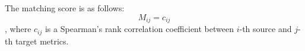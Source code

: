 The matching score is as follows:
\begin{equation}M_{ij}=c_{ij}\end{equation}
, where $c_{ij}$ is a Spearman's rank correlation coefficient between $i$-th
source and $j$-th target metrics.

% 

